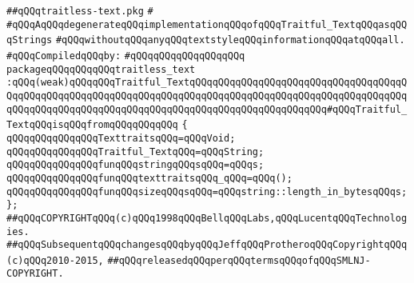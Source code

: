 \label{src/lib/prettyprint/big/src/traitless-text.pkg}
\verb|##qQQqtraitless-text.pkg|\newline
\verb|#|\newline
\verb|#qQQqAqQQqdegenerateqQQqimplementationqQQqofqQQqTraitful_TextqQQqasqQQqStrings|\newline
\verb|#qQQqwithoutqQQqanyqQQqtextstyleqQQqinformationqQQqatqQQqall.|\newline
\newline
\verb|#qQQqCompiledqQQqby:|\newline
\verb|#qQQqqQQqqQQqqQQqqQQq|\newline
\newline
\verb|packageqQQqqQQqqQQqtraitless_text|\newline
\verb|:qQQq(weak)qQQqqQQqTraitful_TextqQQqqQQqqQQqqQQqqQQqqQQqqQQqqQQqqQQqqQQqqQQqqQQqqQQqqQQqqQQqqQQqqQQqqQQqqQQqqQQqqQQqqQQqqQQqqQQqqQQqqQQqqQQqqQQqqQQqqQQqqQQqqQQqqQQqqQQqqQQqqQQqqQQqqQQqqQQqqQQqqQQq#qQQqTraitful_TextqQQqisqQQqfromqQQqqQQqqQQq|\newline
\verb|{|\newline
\verb|qQQqqQQqqQQqqQQqTexttraitsqQQq=qQQqVoid;|\newline
\verb|qQQqqQQqqQQqqQQqTraitful_TextqQQq=qQQqString;|\newline
\verb|qQQqqQQqqQQqqQQqfunqQQqstringqQQqsqQQq=qQQqs;|\newline
\verb|qQQqqQQqqQQqqQQqfunqQQqtexttraitsqQQq_qQQq=qQQq();|\newline
\verb|qQQqqQQqqQQqqQQqfunqQQqsizeqQQqsqQQq=qQQqstring::length_in_bytesqQQqs;|\newline
\verb|};|\newline
\newline
\newline
\verb|##qQQqCOPYRIGHTqQQq(c)qQQq1998qQQqBellqQQqLabs,qQQqLucentqQQqTechnologies.|\newline
\verb|##qQQqSubsequentqQQqchangesqQQqbyqQQqJeffqQQqProtheroqQQqCopyrightqQQq(c)qQQq2010-2015,|\newline
\verb|##qQQqreleasedqQQqperqQQqtermsqQQqofqQQqSMLNJ-COPYRIGHT.|\newline

